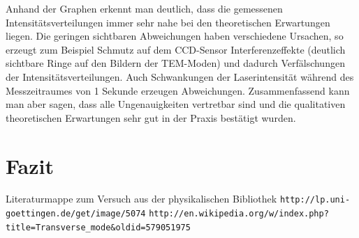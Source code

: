 \documentclass[bigchapter,colorback,accentcolor=tud4b,linedtoc,11pt]{tudreport}
\numberwithin{equation}{subsection}
\begin{document}
Anhand der Graphen erkennt man deutlich, dass die gemessenen Intensitätsverteilungen immer sehr nahe bei den theoretischen Erwartungen liegen. Die geringen sichtbaren Abweichungen haben verschiedene Ursachen, so erzeugt zum Beispiel Schmutz auf dem CCD-Sensor Interferenzeffekte (deutlich sichtbare Ringe auf den Bildern der TEM-Moden) und dadurch Verfälschungen der Intensitätsverteilungen. Auch Schwankungen der Laserintensität während des Messzeitraumes von 1 Sekunde erzeugen Abweichungen. Zusammenfassend kann man aber sagen, dass alle Ungenauigkeiten vertretbar sind und die qualitativen theoretischen Erwartungen sehr gut in der Praxis bestätigt wurden.

\chapter{Fazit}



\cleardoublepage{}

\newpage

\begin{thebibliography}{100}
   Literaturmappe zum Versuch aus der physikalischen Bibliothek
   \verb|http://lp.uni-goettingen.de/get/image/5074|
   \verb|http://en.wikipedia.org/w/index.php?title=Transverse_mode&oldid=579051975|
\end{thebibliography}

\cleardoublepage{}
\listoffigures
\end{document}
